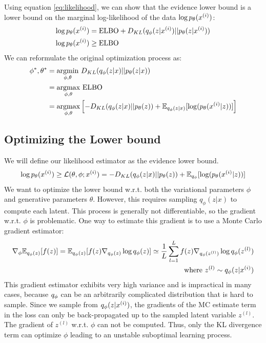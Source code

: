 \documentclass{article}
\begin{document}
Using equation \ref{eq:likelihood}, we can show that the evidence lower bound is a lower bound on the marginal log-likelihood of the data $\log p_\theta(x^{(i)})$:
\begin{align}
    \log p_\theta(x^{(i)}) &= \text{ELBO} + D_{KL}(q_\phi(z|x^{(i)})||p_\theta(z|x^{(i)})) \\
    \log p_\theta(x^{(i)}) &\geq \text{ELBO}
\end{align}
We can reformulate the original optimization process as:
\begin{align}
\phi^*,\theta^* &= \underset{\phi,\theta}{\mathrm{argmin}} ~D_{KL}(q_\phi(z|x)||p_\theta(z|x)) \\ 
&= \underset{\phi,\theta}{\mathrm{argmax}}~\text{ELBO} \\
&= \underset{\phi,\theta}{\mathrm{argmax}} \left[-D_{KL}(q_\phi(z|x)||p_\theta(z)) + \mathbb{E}_{q_\phi(z|x)}[\log (p_\theta(x^{(i)}|z))]\right]
\end{align}

\subsection{Optimizing the Lower bound}
We will define our likelihood estimator as the evidence lower bound.
\begin{align}
    \log p_\theta(x^{(i)}) \geq \mathcal{L}(\theta,\phi;x^{(i)}) = -D_{KL}(q_\phi(z|x)||p_\theta(z)) + \mathbb{E}_{q_\phi}[\log (p_\theta(x^{(i)}|z))] \label{eq:likelihood_estimate}
\end{align}
We want to optimize the lower bound w.r.t. both the variational parameters $\phi$ and generative parameters $\theta$. However, this requires sampling $q_\phi(z|x)$ to compute each latent. This process is generally not differentiable, so the gradient w.r.t. $\phi$ is problematic. One way to estimate this gradient is to use a Monte Carlo gradient estimator:
\begin{align}
    \nabla_\phi \mathbb{E}_{q_\phi(z)}[f(z)] = \mathbb{E}_{q_\phi(z)}[f(z)\nabla_{q_\phi(z)}\log q_\phi(z)] \simeq \frac{1}{L}\sum_{l=1}^Lf(z)\nabla_{q_\phi(z^{(l)})}\log q_\phi(z^{(l)}) \\ \notag \text{~where~} z^{(l)} \sim q_\phi(z|x^{(i)}) \label{eq:MonteCarlo}
\end{align}
This gradient estimator exhibits very high variance and is impractical in many cases, because $q_\phi$ can be an arbitrarily complicated distribution that is hard to sample. Since we sample from $q_\phi(z|x^{(i)})$, the gradients of the MC estimate term in the loss can only be back-propagated up to the sampled latent variable $z^{(l)}$. The gradient of $z^{(l)}$ w.r.t. $\phi$ can not be computed. Thus, only the KL divergence term can optimize $\phi$ leading to an unstable suboptimal learning process.
\end{document}

